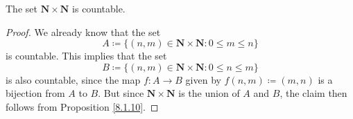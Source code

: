 \begin{corollary}\label{8.1.13}
The set \(\mathbf{N} \times \mathbf{N}\) is countable.
\end{corollary}

\begin{proof}
We already know that the set
\[
    A \coloneqq \{(n, m) \in \mathbf{N} \times \mathbf{N} : 0 \leq m \leq n\}
\]
is countable.
This implies that the set
\[
    B \coloneqq \{(n, m) \in \mathbf{N} \times \mathbf{N} : 0 \leq n \leq m\}
\]
is also countable, since the map \(f : A \to B\) given by \(f(n, m) \coloneqq (m, n)\) is a bijection from \(A\) to \(B\).
But since \(\mathbf{N} \times \mathbf{N}\) is the union of \(A\) and \(B\), the claim then follows from Proposition \ref{8.1.10}.
\end{proof}